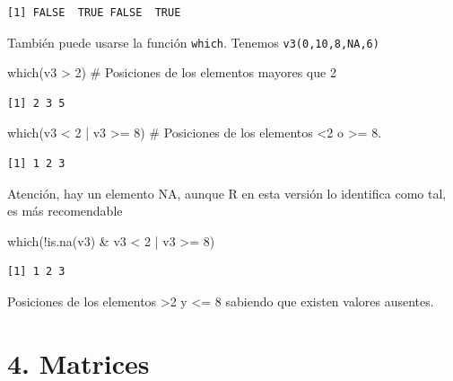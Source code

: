 \documentclass[
  letterpaper,
  DIV=11,
  numbers=noendperiod]{scrreprt}
\newenvironment{Shaded}{\begin{snugshade}}{\end{snugshade}}
\newcommand{\CommentTok}[1]{\textcolor[rgb]{0.37,0.37,0.37}{#1}}
\newcommand{\DecValTok}[1]{\textcolor[rgb]{0.68,0.00,0.00}{#1}}
\newcommand{\FunctionTok}[1]{\textcolor[rgb]{0.28,0.35,0.67}{#1}}
\newcommand{\NormalTok}[1]{\textcolor[rgb]{0.00,0.23,0.31}{#1}}
\newcommand{\SpecialCharTok}[1]{\textcolor[rgb]{0.37,0.37,0.37}{#1}}
\begin{document}
\begin{verbatim}
[1] FALSE  TRUE FALSE  TRUE
\end{verbatim}

También puede usarse la función \texttt{which}. Tenemos
\texttt{v3(0,10,8,NA,6)}

\begin{Shaded}
\begin{Highlighting}[]
\FunctionTok{which}\NormalTok{(v3 }\SpecialCharTok{\textgreater{}} \DecValTok{2}\NormalTok{) }\CommentTok{\# Posiciones de los elementos mayores que 2}
\end{Highlighting}
\end{Shaded}

\begin{verbatim}
[1] 2 3 5
\end{verbatim}

\begin{Shaded}
\begin{Highlighting}[]
\FunctionTok{which}\NormalTok{(v3 }\SpecialCharTok{\textless{}} \DecValTok{2} \SpecialCharTok{|}\NormalTok{ v3 }\SpecialCharTok{\textgreater{}=} \DecValTok{8}\NormalTok{) }\CommentTok{\# Posiciones de los elementos \textless{}2 o \textgreater{}= 8.  }
\end{Highlighting}
\end{Shaded}

\begin{verbatim}
[1] 1 2 3
\end{verbatim}

Atención, hay un elemento NA, aunque R en esta versión lo identifica
como tal, es más recomendable

\begin{Shaded}
\begin{Highlighting}[]
\FunctionTok{which}\NormalTok{(}\SpecialCharTok{!}\FunctionTok{is.na}\NormalTok{(v3) }\SpecialCharTok{\&}\NormalTok{ v3 }\SpecialCharTok{\textless{}} \DecValTok{2} \SpecialCharTok{|}\NormalTok{ v3 }\SpecialCharTok{\textgreater{}=} \DecValTok{8}\NormalTok{) }
\end{Highlighting}
\end{Shaded}

\begin{verbatim}
[1] 1 2 3
\end{verbatim}

Posiciones de los elementos \textgreater2 y \textless= 8 sabiendo que
existen valores ausentes.

\hypertarget{matrices}{%
\section{4. Matrices}\label{matrices}}
\end{document}
